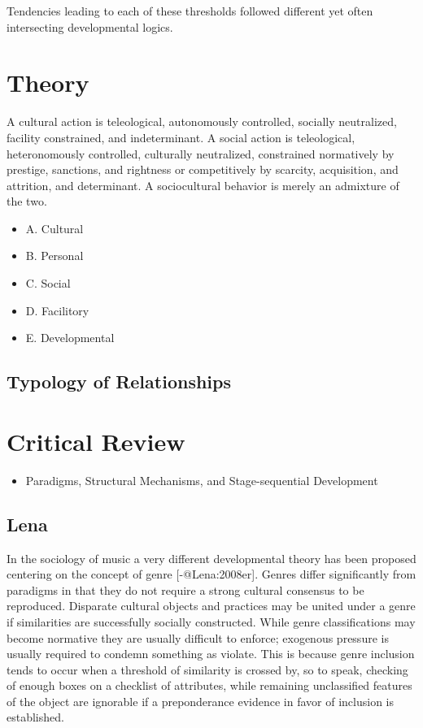 \documentclass [PhD] {uclathes}
\providecommand{\tightlist}{
  \setlength{\itemsep}{0pt}\setlength{\parskip}{0pt}}
\begin{document}
Tendencies leading to each of these thresholds followed different yet
often intersecting developmental logics.

\section{Theory}\label{theory}

A cultural action is teleological, autonomously controlled, socially
neutralized, facility constrained, and indeterminant. A social action is
teleological, heteronomously controlled, culturally neutralized,
constrained normatively by prestige, sanctions, and rightness or
competitively by scarcity, acquisition, and attrition, and determinant.
A sociocultural behavior is merely an admixture of the two.

\begin{itemize}
\tightlist
\item
  A. Cultural
\item
  B. Personal
\item
  C. Social
\item
  D. Facilitory
\item
  E. Developmental
\end{itemize}

\subsection{Typology of Relationships}\label{typology-of-relationships}

\section{Critical Review}\label{critical-review}

\begin{itemize}
\tightlist
\item
  Paradigms, Structural Mechanisms, and Stage-sequential Development
\end{itemize}

\subsection{Lena}\label{lena}

In the sociology of music a very different developmental theory has been
proposed centering on the concept of genre {[}-@Lena:2008er{]}. Genres
differ significantly from paradigms in that they do not require a strong
cultural consensus to be reproduced. Disparate cultural objects and
practices may be united under a genre if similarities are successfully
socially constructed. While genre classifications may become normative
they are usually difficult to enforce; exogenous pressure is usually
required to condemn something as violate. This is because genre
inclusion tends to occur when a threshold of similarity is crossed by,
so to speak, checking of enough boxes on a checklist of attributes,
while remaining unclassified features of the object are ignorable if a
preponderance evidence in favor of inclusion is established.
\end{document}
